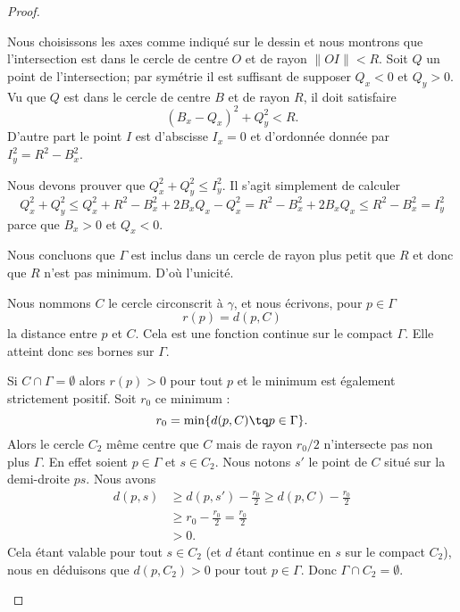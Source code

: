 \begin{proof}
\begin{subproof}
		Nous choisissons les axes comme indiqué sur le dessin et nous montrons que l'intersection est dans le cercle de centre \( O\) et de rayon \( \| OI \|<R\). Soit \( Q\) un point de l'intersection; par symétrie il est suffisant de supposer \( Q_x<0\) et \( Q_y>0\). Vu que \( Q\) est dans le cercle de centre \( B\) et de rayon \( R\), il doit satisfaire
		\begin{equation}
			(B_x-Q_x)^2+Q_{y}^2<R.
		\end{equation}
		D'autre part le point \( I\) est d'abscisse \( I_x=0\) et d'ordonnée donnée par \( I_y^2=R^2-B_x^2\).

		Nous devons prouver que \( Q_x^2+Q_y^2\leq I_y^2\). Il s'agit simplement de calculer
		\begin{equation}
			Q_x^2+Q_y^2\leq Q_x^2+R^2-B_x^2+2B_xQ_x-Q_x^2=R^2-B_x^2+2B_xQ_x\leq R^2-B_x^2=I_y^2
		\end{equation}
		parce que \( B_x>0\) et \( Q_x<0\).

		Nous concluons que \( \Gamma\) est inclus dans un cercle de rayon plus petit que \( R\) et donc que \( R\) n'est pas minimum. D'où l'unicité.


		Nous nommons \( C\) le cercle circonscrit à \( \gamma\), et nous écrivons, pour \( p\in \Gamma\)
		\begin{equation}
			r(p)=d(p,C)
		\end{equation}
		la distance entre \( p\) et \( C\). Cela est une fonction continue sur le compact \( \Gamma\). Elle atteint donc ses bornes sur \( \Gamma\).
		\begin{subproof}

			Si \( C\cap \Gamma=\emptyset\) alors \( r(p)>0\) pour tout \( p\) et le minimum est également strictement positif. Soit \( r_0\) ce minimum :
			\begin{equation}
				r_0=\min\{ d(p,C)\tq p\in \Gamma \}.
			\end{equation}
			Alors le cercle \( C_2\) même centre que \( C\) mais de rayon \( r_0/2\) n'intersecte pas non plus \( \Gamma\). En effet soient \( p\in \Gamma\) et \( s\in C_2\). Nous notons \( s'\) le point de \( C\) situé sur la demi-droite \( ps\). Nous avons
			\begin{subequations}
				\begin{align}
					d(p,s) & \geq d(p,s')-\frac{ r_0 }{2}  \geq d(p,C)-\frac{ r_0 }{2} \\
					       & \geq r_0-\frac{ r_0 }{2}      =\frac{ r_0 }{2}            \\
					       & >0.
				\end{align}
			\end{subequations}
			Cela étant valable pour tout \( s\in C_2\) (et \( d\) étant continue en \( s\) sur le compact \( C_2\)), nous en déduisons que \( d(p,C_2)>0\) pour tout \( p\in \Gamma\). Donc \( \Gamma\cap C_2=\emptyset\).


\end{subproof}
\end{subproof}
\end{proof}
